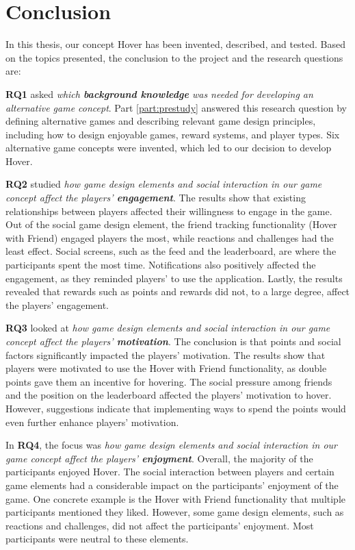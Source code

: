 \section{Conclusion}
\label{chap:conclusion}
In this thesis, our concept Hover has been invented, described, and tested. Based on the topics presented, the conclusion to the project and the research questions are:

\textbf{RQ1} asked \textit{which \textbf{background knowledge} was needed for developing an alternative game concept}. Part \ref{part:prestudy} answered this research question by defining alternative games and describing relevant game design principles, including how to design enjoyable games, reward systems, and player types. Six alternative game concepts were invented, which led to our decision to develop Hover.

\textbf{RQ2} studied \textit{how game design elements and social interaction in our game concept affect the players’ \textbf{engagement}}. The results show that existing relationships between players affected their willingness to engage in the game. Out of the social game design element, the friend tracking functionality (Hover with Friend) engaged players the most, while reactions and challenges had the least effect. Social screens, such as the feed and the leaderboard, are where the participants spent the most time. Notifications also positively affected the engagement, as they reminded players’ to use the application. Lastly, the results revealed that rewards such as points and rewards did not, to a large degree, affect the players’ engagement.

\textbf{RQ3} looked at \textit{how game design elements and social interaction in our game concept affect the players’ \textbf{motivation}}. The conclusion is that points and social factors significantly impacted the players’ motivation. The results show that players were motivated to use the Hover with Friend functionality, as double points gave them an incentive for hovering. The social pressure among friends and the position on the leaderboard affected the players’ motivation to hover. However, suggestions indicate that implementing ways to spend the points would even further enhance players’ motivation. 

In \textbf{RQ4}, the focus was \textit{how game design elements and social interaction in our game concept affect the players’ \textbf{enjoyment}}. Overall, the majority of the participants enjoyed Hover. The social interaction between players and certain game elements had a considerable impact on the participants’ enjoyment of the game. One concrete example is the Hover with Friend functionality that multiple participants mentioned they liked. However, some game design elements, such as reactions and challenges, did not affect the participants’ enjoyment. Most participants were neutral to these elements.  


